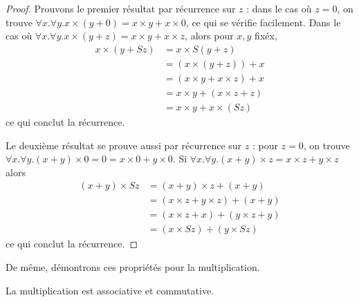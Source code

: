 \begin{proof}
    Prouvons le premier résultat par récurrence sur $z$ : dans le cas où $z=0$, on trouve $\forall x.\forall y.x\times (y+0) = x\times y + x\times 0$, ce qui se vérifie facilement. Dans le cas où $\forall x.\forall y. x\times (y+z) = x\times y + x\times z$, alors pour $x,y$ fixéx, \begin{align*}    x\times (y+Sz)&=x\times S(y+z) \\
     &= (x\times (y+z)) + x \\
     &= (x\times y + x\times z) + x\\
     &= x\times y + (x\times z +z)\\
     &= x\times y + x \times (S z)
     \end{align*}
     ce qui conclut la récurrence.

     Le deuxième résultat se prouve aussi par récurrence sur $z$ : pour $z=0$, on trouve $\forall x.\forall y. (x+y)\times 0 = 0 =x\times 0 + y\times 0$. Si $\forall x.\forall y. (x+y)\times z=x\times z + y\times z$ alors \begin{align*}
         (x+y)\times Sz &= (x+y)\times z + (x+y)\\
         &= (x\times z + y\times z) + (x + y)\\
         &= (x\times z + x) + (y\times z + y)\\
         &= (x\times Sz) + (y\times Sz)
     \end{align*}
     ce qui conclut la récurrence.
\end{proof}

De même, démontrons ces propriétés pour la multiplication.

\begin{prop}
    La multiplication est associative et commutative.
\end{prop}

